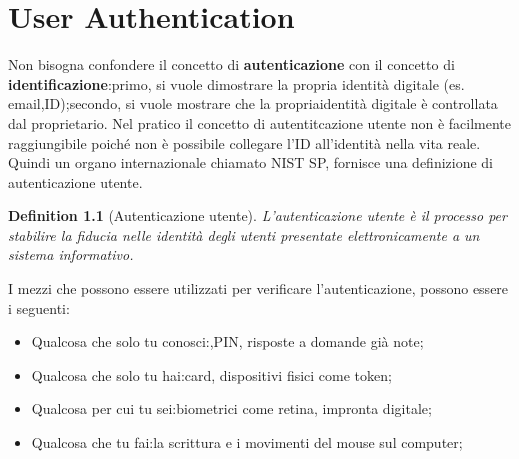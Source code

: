 \documentclass{book}
\newtheorem{definition}{Definition}[section]
\theoremstyle{remark}
\begin{document}
\chapter{User Authentication}
Non bisogna confondere il concetto di \textbf{autenticazione} con il concetto di \textbf{identificazione}:\@nel primo, si vuole dimostrare la propria identità digitale (es\@. email,ID);\@nel secondo, si vuole mostrare che la propriaidentità digitale è controllata dal proprietario\@.
Nel pratico il concetto di autentitcazione utente non è facilmente raggiungibile poiché non è possibile collegare l'ID all'identità nella vita reale\@. Quindi un organo internazionale chiamato NIST SP, fornisce una definizione di autenticazione utente\@.
\begin{definition}[Autenticazione utente]
	L'autenticazione utente è il processo per stabilire la fiducia nelle identità degli utenti presentate elettronicamente a un sistema informativo\@.
\end{definition}
I mezzi che possono essere utilizzati per verificare l'autenticazione, possono essere i seguenti:
\begin{itemize}
	\item Qualcosa che solo tu conosci:\@Password,PIN, risposte a domande già note;\@
	\item Qualcosa che solo tu hai:\@Smart card, dispositivi fisici come token;\@
	\item Qualcosa per cui tu sei:\@dati biometrici come retina, impronta digitale;\@
	\item Qualcosa che tu fai:\@come la scrittura e i movimenti del mouse sul computer;\@
\end{itemize}
\end{document}
